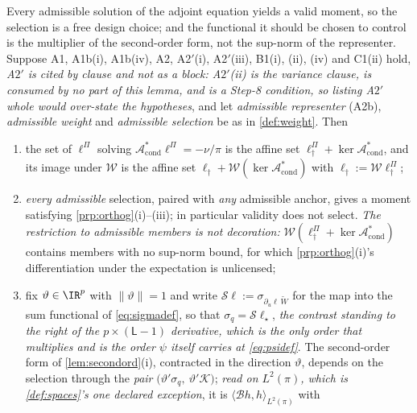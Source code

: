 \begin{lemma}\label{lem:solset}
Every admissible solution of the adjoint equation yields a valid moment, so the selection is a free
design choice; and the functional it should be chosen to control is the multiplier of the second-order
form, not the sup-norm of the representer.
Suppose A1, A1b(i), A1b(iv), A2, A2$'$(i), A2$'$(iii), B1(i), (ii), (iv) and C1(ii) hold, \emph{A$2'$
is cited by clause and not as a block: A$2'$(ii) is the variance clause, is consumed by no part of this
lemma, and is a Step-8 condition, so listing A$2'$ whole would over-state the hypotheses}, and let
\emph{admissible representer} (A2b), \emph{admissible weight} and \emph{admissible selection} be as in
\cref{def:weight}. Then
\begin{enumerate}
\item[(i)] the set of $\ell^\Pi$ solving $\mathcal A^\ast_{\mathrm{cond}}\ell^\Pi=-\nu/\pi$ is the affine
set $\ell^\Pi_\dagger+\ker\mathcal A^\ast_{\mathrm{cond}}$, and its image under $\mathcal W$ is the
affine set $\ell_\dagger+\mathcal W(\ker\mathcal A^\ast_{\mathrm{cond}})$ with
$\ell_\dagger:=\mathcal W\ell^\Pi_\dagger$;
\item[(ii)] \emph{every admissible} selection, paired with \emph{any} admissible anchor, gives a moment
satisfying \cref{prp:orthog}(i)--(iii); in particular validity does not select. \emph{The restriction to
admissible members is not decoration:} $\mathcal W(\ell^\Pi_\dagger+\ker\mathcal A^\ast_{\mathrm{cond}})$
contains members with no sup-norm bound, for which \cref{prp:orthog}(i)'s differentiation under the
expectation is unlicensed;
\item[(iii)] fix $\vartheta\in\IR^{p}$ with $\|\vartheta\|=1$ and write
$\mathcal S\ell:=\sigma_{\partial_u\ell\,\widetilde W}$ for the map into the sum functional of
\eqref{eq:sigmadef}, so that $\sigma_q=\mathcal S\ell_\star$, \emph{the contrast standing to the
right of the $p\times(\mathsf L-1)$ derivative, which is the only order that multiplies and is the order
$\psi$ itself carries at \eqref{eq:psidef}}. The second-order form of
\cref{lem:secondord}(i), contracted in the direction $\vartheta$, depends on the selection through the
\emph{pair} $\big(\vartheta'\sigma_q,\ \vartheta'\mathcal K\big)$; \emph{read on $L^{2}(\pi)$, which is
\cref{def:spaces}'s one declared exception}, it is $\langle\mathcal Bh,h\rangle_{L^{2}(\pi)}$ with

\end{enumerate}
\end{lemma}
